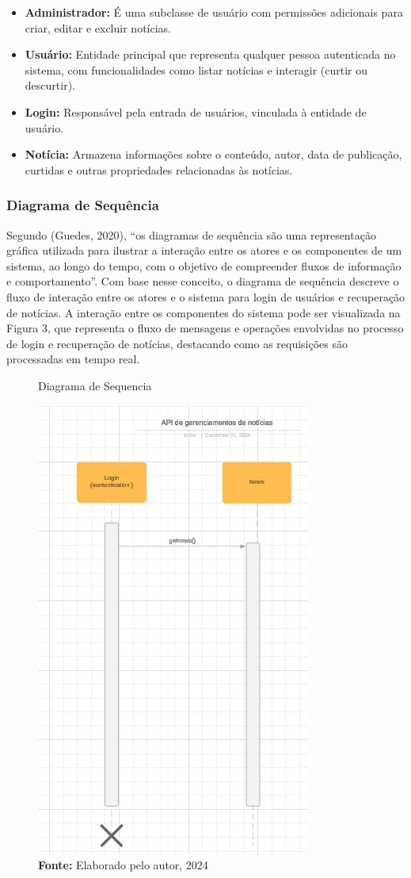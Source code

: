 \begin{itemize}
    \item \textbf{Administrador:} É uma subclasse de usuário com permissões adicionais para criar, editar e excluir notícias.
    \item \textbf{Usuário:} Entidade principal que representa qualquer pessoa autenticada no sistema, com funcionalidades como listar notícias e interagir (curtir ou descurtir).
    \item \textbf{Login:} Responsável pela entrada de usuários, vinculada à entidade de usuário.
    \item \textbf{Notícia:} Armazena informações sobre o conteúdo, autor, data de publicação, curtidas e outras propriedades relacionadas às notícias.
\end{itemize}


\subsubsection{Diagrama de Sequência} 

Segundo (Guedes, 2020), “os diagramas de sequência são uma representação gráfica utilizada para ilustrar a interação entre os atores e os componentes de um sistema, ao longo do tempo, com o objetivo de compreender fluxos de informação e comportamento”. Com base nesse conceito, o diagrama de sequência descreve o fluxo de interação entre os atores e o sistema para login de usuários e recuperação de notícias. A interação entre os componentes do sistema pode ser visualizada na Figura 3, que representa o fluxo de mensagens e operações envolvidas no processo de login e recuperação de notícias, destacando como as requisições são processadas em tempo real.

\begin{figure} [H]
    \centering
    \caption{Diagrama de Sequencia}
    \includegraphics[width=0.5\linewidth]{imagens/sequencia diagrama.jpeg}
    \caption*{\textbf{Fonte:} Elaborado pelo autor, 2024}
    \label{fig:enter-label}
\end{figure}

